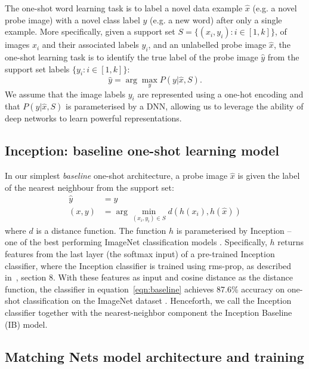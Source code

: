 \documentclass{article}
\begin{document}
The one-shot word learning task is to label a novel data example $\hat{x}$ (e.g. a novel probe image) with a novel class label $\hat{y}$  (e.g. a new word) after only a single example. More specifically, given a support set $S=\{(x_i,y_i): i \in [1,k]\}$, of images $x_i$ and their associated labels $y_i$, and an unlabelled probe image $\hat{x}$, the one-shot learning task is to identify the true label of the probe image $\hat{y}$ from the support set labels $\{y_i: i \in [1,k]\}$:
\begin{equation}
\label{eqn:one-shot-general}
    \hat{y} = \displaystyle{\arg \max_y P(y | \hat{x}, S)}  . 
\end{equation}
We assume that the image labels $y_i$ are represented using a one-hot encoding and that $ P(y | \hat{x}, S)$ is parameterised by a DNN, allowing us to leverage the ability of deep networks to learn powerful representations. 

\subsection{Inception: baseline one-shot learning model}

In our simplest \emph{baseline} one-shot architecture, a probe image $\hat{x}$ is given the label of the nearest neighbour from the support set: 
\begin{equation} 
\begin{split}
\hat{y} &= y \\ 
(x, y) &= \displaystyle{\arg \min_{(x_i,y_i) \in S } d(h(x_i),h(\hat{x}))}
\end{split}
\label{eqn:baseline}
\end{equation}
where $d$ is a distance function. The function $h$ is parameterised by Inception -- one of the best performing ImageNet classification models \citep{szegedy2015going}. Specifically, $h$ returns features from the last layer (the softmax input) of a pre-trained Inception classifier, where the Inception classifier is trained using rms-prop, as described in~\citet{szegedy2015rethinking}, section 8. With these features as input and cosine distance as the distance function, the classifier in equation~\ref{eqn:baseline} achieves 87.6\% accuracy on one-shot classification on the ImageNet dataset \citep{vinyals2016matching}. Henceforth, we call the Inception classifier together with the nearest-neighbor component the Inception Baseline (IB) model.

\subsection{Matching Nets model architecture and training}\label{sec:MN}
\end{document}
